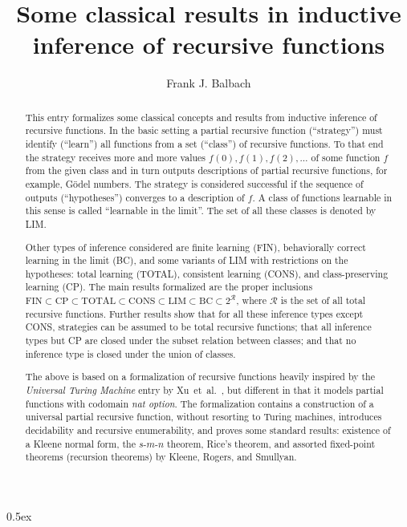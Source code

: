 \documentclass[11pt,a4paper]{report}
\begin{document}
\title{Some classical results in inductive inference of recursive functions}
\author{Frank J. Balbach}
\maketitle

\begin{abstract}
This entry formalizes some classical concepts and results from inductive
inference of recursive functions. In the basic setting a partial recursive
function (``strategy'') must identify (``learn'') all functions from a set
(``class'') of recursive functions. To that end the strategy receives more and
more values $f(0), f(1), f(2), \ldots$ of some function $f$ from the given class
and in turn outputs descriptions of partial recursive functions, for example,
Gödel numbers. The strategy is considered successful if the sequence of outputs
(``hypotheses'') converges to a description of $f$. A class of functions
learnable in this sense is called ``learnable in the limit''. The set of all
these classes is denoted by LIM.

Other types of inference considered are finite learning (FIN), behaviorally
correct learning in the limit (BC), and some variants of LIM with restrictions
on the hypotheses: total learning (TOTAL), consistent learning (CONS), and
class-preserving learning (CP). The main results formalized are the proper
inclusions $\mathrm{FIN} \subset \mathrm{CP} \subset \mathrm{TOTAL} \subset
\mathrm{CONS} \subset \mathrm{LIM} \subset \mathrm{BC} \subset 2^{\mathcal{R}}$,
where $\mathcal{R}$ is the set of all total recursive functions.  Further
results show that for all these inference types except CONS, strategies can be
assumed to be total recursive functions; that all inference types but CP are
closed under the subset relation between classes; and that no inference type is
closed under the union of classes.

The above is based on a formalization of recursive functions heavily inspired by
the \emph{Universal Turing Machine} entry by
Xu~et~al.~\cite{Universal_Turing_Machine-AFP}, but different in that it models
partial functions with codomain \emph{nat option}. The formalization contains a
construction of a universal partial recursive function, without resorting to
Turing machines, introduces decidability and recursive enumerability, and proves
some standard results: existence of a Kleene normal form, the $s$-$m$-$n$
theorem, Rice's theorem, and assorted fixed-point theorems (recursion theorems)
by Kleene, Rogers, and Smullyan.
\end{abstract}

\tableofcontents

\newpage

\parindent 0pt\parskip 0.5ex





\end{document}

